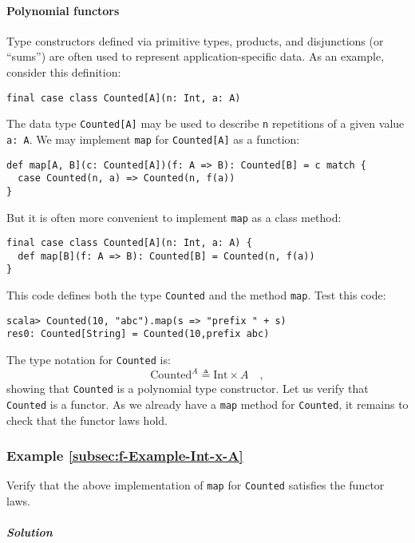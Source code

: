 \paragraph{Polynomial functors}

Type constructors defined
via primitive types, products, and disjunctions (or \textsf{``}sums\textsf{''}) are
often used to represent application-specific data. As an example,
consider this definition:
\begin{lstlisting}
final case class Counted[A](n: Int, a: A)
\end{lstlisting}
The data type \lstinline!Counted[A]! may be used to describe \lstinline!n!
repetitions of a given value \lstinline!a: A!. We may implement \lstinline!map!
for \lstinline!Counted[A]! as a function:
\begin{lstlisting}
def map[A, B](c: Counted[A])(f: A => B): Counted[B] = c match {
  case Counted(n, a) => Counted(n, f(a))
}
\end{lstlisting}
But it is often more convenient to implement \lstinline!map! as a
class method:

\begin{lstlisting}
final case class Counted[A](n: Int, a: A) {
  def map[B](f: A => B): Counted[B] = Counted(n, f(a))
}
\end{lstlisting}
This code defines both the type \lstinline!Counted! and the method
\lstinline!map!. Test this code:
\begin{lstlisting}
scala> Counted(10, "abc").map(s => "prefix " + s)
res0: Counted[String] = Counted(10,prefix abc) 
\end{lstlisting}

The type notation for \lstinline!Counted! is:
\[
\text{Counted}^{A}\triangleq\text{Int}\times A\quad,
\]
showing that \lstinline!Counted! is a polynomial type constructor.
Let us verify that \lstinline!Counted! is a functor. As we already
have a \lstinline!map! method for \lstinline!Counted!, it remains
to check that the functor laws hold.

\subsubsection{Example \label{subsec:f-Example-Int-x-A}\ref{subsec:f-Example-Int-x-A}}

Verify that the above implementation of \lstinline!map! for \lstinline!Counted!
satisfies the functor laws. 

\subparagraph{Solution}

